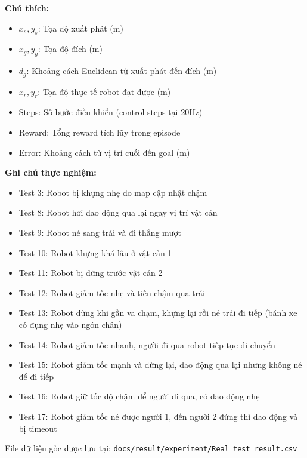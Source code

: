 \textbf{Chú thích:}
\begin{itemize}[nosep]
\item $x_s, y_s$: Tọa độ xuất phát (m)
\item $x_g, y_g$: Tọa độ đích (m)
\item $d_g$: Khoảng cách Euclidean từ xuất phát đến đích (m)
\item $x_r, y_r$: Tọa độ thực tế robot đạt được (m)
\item Steps: Số bước điều khiển (control steps tại 20Hz)
\item Reward: Tổng reward tích lũy trong episode
\item Error: Khoảng cách từ vị trí cuối đến goal (m)
\end{itemize}

\textbf{Ghi chú thực nghiệm:}
\begin{itemize}[nosep]
\item Test 3: Robot bị khựng nhẹ do map cập nhật chậm
\item Test 8: Robot hơi dao động qua lại ngay vị trí vật cản
\item Test 9: Robot né sang trái và đi thẳng mượt
\item Test 10: Robot khựng khá lâu ở vật cản 1
\item Test 11: Robot bị dừng trước vật cản 2
\item Test 12: Robot giảm tốc nhẹ và tiến chậm qua trái
\item Test 13: Robot dừng khi gần va chạm, khựng lại rồi né trái đi tiếp (bánh xe có đụng nhẹ vào ngón chân)
\item Test 14: Robot giảm tốc nhanh, người đi qua robot tiếp tục di chuyển
\item Test 15: Robot giảm tốc mạnh và dừng lại, dao động qua lại nhưng không né để đi tiếp
\item Test 16: Robot giữ tốc độ chậm để người đi qua, có dao động nhẹ
\item Test 17: Robot giảm tốc né được người 1, đến người 2 đứng thì dao động và bị timeout
\end{itemize}

File dữ liệu gốc được lưu tại: \texttt{docs/result/experiment/Real\_test\_result.csv}
